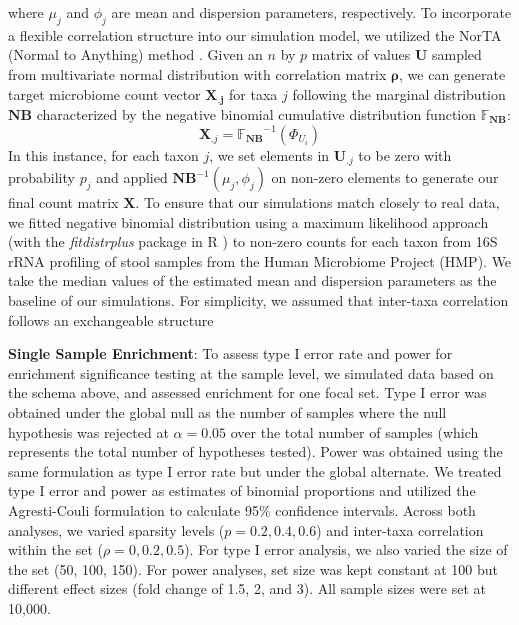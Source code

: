 \documentclass[10pt,letterpaper]{article}
\begin{document}
where $\mu_j$ and $\phi_j$ are mean and dispersion parameters, respectively. To incorporate a flexible correlation structure into our simulation model, we utilized the NorTA (Normal to Anything) method \cite{cario1997}. Given an $n$ by $p$ matrix of values $\mathbf{U}$ sampled from multivariate normal distribution with correlation matrix $\mathbf{\rho}$, we can generate target microbiome count vector $\mathbf{X_{.j}}$ for taxa $j$ following the marginal distribution $\mathbf{NB}$ characterized by the negative binomial cumulative distribution function $\mathbb{F_{\mathbf{NB}}}$:
\begin{equation}
    \mathbf{X}_{.j} = \mathbb{F_{\mathbf{NB}}}^{-1}(\Phi_{U_i})
\end{equation}
In this instance, for each taxon $j$, we set elements in $\mathbf{U}_{.j}$ to be zero with probability $p_j$ and applied $\mathbf{NB}^{-1}(\mu_j, \phi_j)$ on non-zero elements to generate our final count matrix $\mathbf{X}$. To ensure that our simulations match closely to real data, we fitted negative binomial distribution using a maximum likelihood approach (with the \emph{fitdistrplus} package in R \cite{delignette-muller2015}) to non-zero counts for each taxon from 16S rRNA profiling of stool samples from the Human Microbiome Project (HMP). We take the median values of the estimated mean and dispersion parameters as the baseline of our simulations. For simplicity, we assumed that inter-taxa correlation follows an exchangeable structure

\noindent \textbf{Single Sample Enrichment}: To assess type I error rate and power for enrichment significance testing at the sample level, we simulated data based on the schema above, and assessed enrichment for one focal set. Type I error was obtained under the global null as the number of samples where the null hypothesis was rejected at $\alpha = 0.05$ over the total number of samples (which represents the total number of hypotheses tested). Power was obtained using the same formulation as type I error rate but under the global alternate. We treated type I error and power as estimates of binomial proportions and utilized the Agresti-Couli \cite{agresti1998} formulation to calculate 95\% confidence intervals. Across both analyses, we varied sparsity levels ($p = 0.2, 0.4, 0.6$) and inter-taxa correlation within the set ($\rho = 0, 0.2, 0.5$). For type I error analysis, we also varied the size of the set (50, 100, 150). For power analyses, set size was kept constant at 100 but different effect sizes (fold change of 1.5, 2, and 3). All sample sizes were set at 10,000. 
\end{document}
